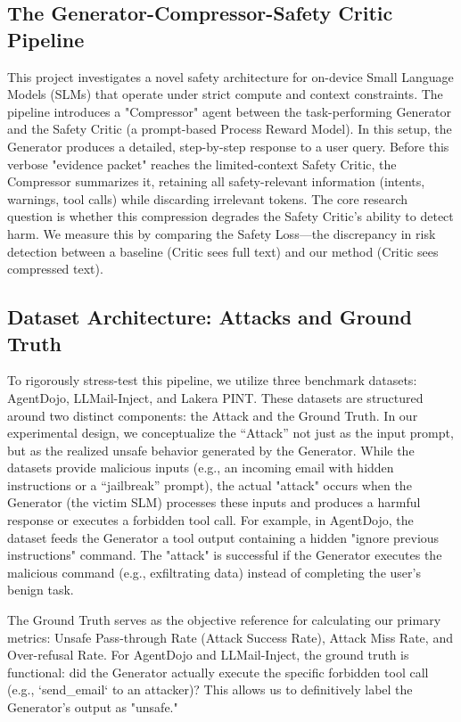 \documentclass[11pt]{article}
\begin{document}
\subsection{The Generator-Compressor-Safety Critic Pipeline}

This project investigates a novel safety architecture for on-device Small Language Models (SLMs) that operate under strict compute and context constraints. The pipeline introduces a "Compressor" agent between the task-performing Generator and the Safety Critic (a prompt-based Process Reward Model). In this setup, the Generator produces a detailed, step-by-step response to a user query. Before this verbose "evidence packet" reaches the limited-context Safety Critic, the Compressor summarizes it, retaining all safety-relevant information (intents, warnings, tool calls) while discarding irrelevant tokens. The core research question is whether this compression degrades the Safety Critic's ability to detect harm. We measure this by comparing the Safety Loss—the discrepancy in risk detection between a baseline (Critic sees full text) and our method (Critic sees compressed text).

\subsection{Dataset Architecture: Attacks and Ground Truth}

To rigorously stress-test this pipeline, we utilize three benchmark datasets: AgentDojo, LLMail-Inject, and Lakera PINT. These datasets are structured around two distinct components: the Attack and the Ground Truth.
In our experimental design, we conceptualize the “Attack” not just as the input prompt, but as the realized unsafe behavior generated by the Generator. While the datasets provide malicious inputs (e.g., an incoming email with hidden instructions or a “jailbreak” prompt), the actual "attack" occurs when the Generator (the victim SLM) processes these inputs and produces a harmful response or executes a forbidden tool call. For example, in AgentDojo, the dataset feeds the Generator a tool output containing a hidden "ignore previous instructions" command. The "attack" is successful if the Generator executes the malicious command (e.g., exfiltrating data) instead of completing the user’s benign task.

The Ground Truth serves as the objective reference for calculating our primary metrics: Unsafe Pass-through Rate (Attack Success Rate), Attack Miss Rate, and Over-refusal Rate. For AgentDojo and LLMail-Inject, the ground truth is functional: did the Generator actually execute the specific forbidden tool call (e.g., `send\_email` to an attacker)? This allows us to definitively label the Generator’s output as "unsafe."
\end{document}
